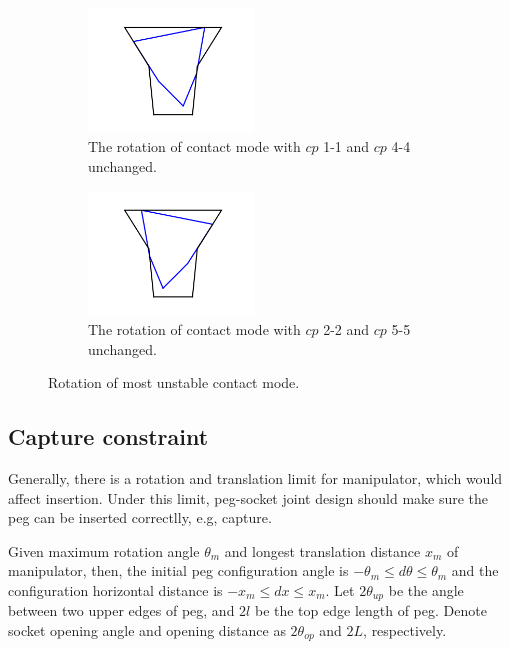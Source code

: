 \begin{figure}
\begin{center}
\begin{subfigure}[t]{0.24\textwidth}
\begin{center}
\includegraphics[height=1.3in]{figures/5_5rotate1.png}
\end{center}
\label{fig:5_5rotate1}
\caption{The rotation of contact mode with ${cp}$ 1-1 and ${cp}$ 4-4 unchanged. }
\end{subfigure}
\begin{subfigure}[t]{0.24\textwidth}
\begin{center}
\includegraphics[height=1.3in]{figures/5_5rotate2.png}
\end{center}
\label{fig:5_5rotate2}
\caption{The rotation of contact mode with ${cp}$ 2-2 and ${cp}$ 5-5 unchanged. }
\end{subfigure}
\label{fig:5_5rotate}
\caption{Rotation of most unstable contact mode. }
\end{center}
\end{figure}

\subsection{Capture constraint}

Generally, there is a rotation and translation limit for manipulator, which would affect insertion. Under this limit, peg-socket joint design should make sure the peg can be inserted correctlly, e.g, capture. 

Given maximum rotation angle ${\theta}_m$ and longest translation distance ${x}_m$ of manipulator, then, the initial peg configuration angle is $-{\theta}_m\le{d\theta}\le{\theta}_m$ and the configuration horizontal distance is $-{x}_m\le{dx}\le{x}_m$. Let ${2\theta}_{up}$ be the angle between two upper edges of peg, and ${2l}$ be the top edge length of peg. Denote socket opening angle and opening distance as $2{\theta}_{op}$ and $2{L}$, respectively.

